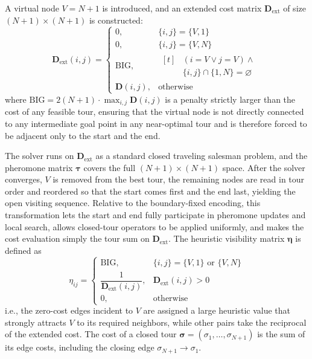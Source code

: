 \documentclass[pdflatex,sn-basic,Numbered]{sn-jnl}
\begin{document}
A virtual node $V = N + 1$ is introduced, and an extended cost matrix $\mathbf{D}_{\mathrm{ext}}$ of size $(N+1) \times (N+1)$ is constructed:
\begin{equation}
\mathbf{D}_{\mathrm{ext}}(i, j) =
\begin{cases}
0, & \{i, j\} = \{V, 1\} \\
0, & \{i, j\} = \{V, N\} \\
\mathrm{BIG}, & \begin{aligned}[t]
& (i = V \lor j = V) \land \\
& \{i, j\} \cap \{1, N\} = \varnothing
\end{aligned} \\
\mathbf{D}(i, j), & \text{otherwise}
\end{cases}
\label{eq:dext}
\end{equation}
where $\mathrm{BIG} = 2(N+1) \cdot \max_{i,j} \mathbf{D}(i,j)$ is a penalty strictly larger than the cost of any feasible tour, ensuring that the virtual node is not directly connected to any intermediate goal point in any near-optimal tour and is therefore forced to be adjacent only to the start and the end.

The solver runs on $\mathbf{D}_{\mathrm{ext}}$ as a standard closed traveling salesman problem, and the pheromone matrix $\bm{\tau}$ covers the full $(N+1)\times(N+1)$ space. After the solver converges, $V$ is removed from the best tour, the remaining nodes are read in tour order and reordered so that the start comes first and the end last, yielding the open visiting sequence. Relative to the boundary-fixed encoding, this transformation lets the start and end fully participate in pheromone updates and local search, allows closed-tour operators to be applied uniformly, and makes the cost evaluation simply the tour sum on $\mathbf{D}_{\mathrm{ext}}$. The heuristic visibility matrix $\bm{\eta}$ is defined as
\begin{equation}
\eta_{ij} =
\begin{cases}
\mathrm{BIG}, & \{i, j\} = \{V, 1\} \text{ or } \{V, N\} \\
\dfrac{1}{\mathbf{D}_{\mathrm{ext}}(i,j)}, & \mathbf{D}_{\mathrm{ext}}(i,j) > 0 \\
0, & \text{otherwise}
\end{cases}
\label{eq:eta}
\end{equation}
i.e., the zero-cost edges incident to $V$ are assigned a large heuristic value that strongly attracts $V$ to its required neighbors, while other pairs take the reciprocal of the extended cost. The cost of a closed tour $\bm{\sigma} = (\sigma_1, \dots, \sigma_{N+1})$ is the sum of its edge costs, including the closing edge $\sigma_{N+1} \to \sigma_1$.
\end{document}

